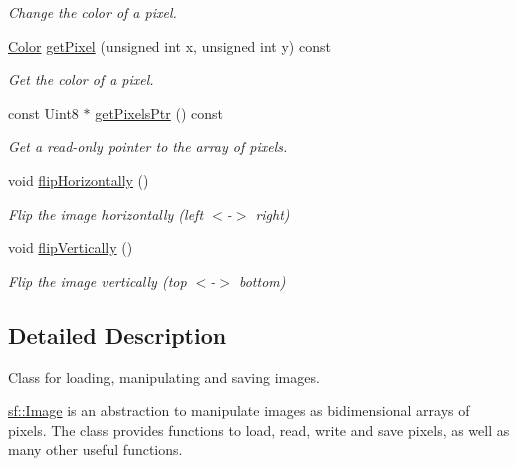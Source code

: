 \begin{DoxyCompactItemize}
\begin{DoxyCompactList}\small\item\em Change the color of a pixel. \end{DoxyCompactList}\item 
\hyperlink{classsf_1_1_color}{Color} \hyperlink{classsf_1_1_image_a8c8460e311dcb00557cb00a81c29163d}{get\+Pixel} (unsigned int x, unsigned int y) const 
\begin{DoxyCompactList}\small\item\em Get the color of a pixel. \end{DoxyCompactList}\item 
const Uint8 $\ast$ \hyperlink{classsf_1_1_image_ac6137a608a9efaae2735c13ff259c214}{get\+Pixels\+Ptr} () const 
\begin{DoxyCompactList}\small\item\em Get a read-\/only pointer to the array of pixels. \end{DoxyCompactList}\item 
\hypertarget{classsf_1_1_image_a57168e7bc29190e08bbd6c9c19f4bb2c}{void \hyperlink{classsf_1_1_image_a57168e7bc29190e08bbd6c9c19f4bb2c}{flip\+Horizontally} ()}\label{classsf_1_1_image_a57168e7bc29190e08bbd6c9c19f4bb2c}

\begin{DoxyCompactList}\small\item\em Flip the image horizontally (left $<$-\/$>$ right) \end{DoxyCompactList}\item 
\hypertarget{classsf_1_1_image_a78a702a7e49d1de2dec9894da99d279c}{void \hyperlink{classsf_1_1_image_a78a702a7e49d1de2dec9894da99d279c}{flip\+Vertically} ()}\label{classsf_1_1_image_a78a702a7e49d1de2dec9894da99d279c}

\begin{DoxyCompactList}\small\item\em Flip the image vertically (top $<$-\/$>$ bottom) \end{DoxyCompactList}\end{DoxyCompactItemize}


\subsection{Detailed Description}
Class for loading, manipulating and saving images. 

\hyperlink{classsf_1_1_image}{sf\+::\+Image} is an abstraction to manipulate images as bidimensional arrays of pixels. The class provides functions to load, read, write and save pixels, as well as many other useful functions.

